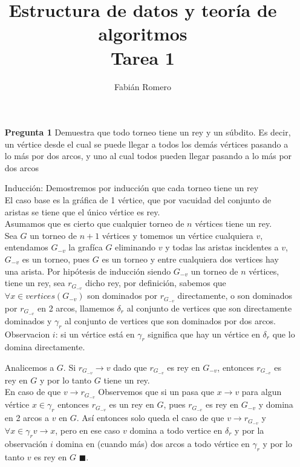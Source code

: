 \documentclass[12pt]{articlels
}
\title{Estructura de datos y teoría de algoritmos\\
Tarea 1 }
\author{Fabián Romero}
\begin{document}
\lstset{language=python}
\maketitle

\begin{itemize}
  \item[\bf{Pregunta 1}] Demuestra que todo torneo tiene un rey y un súbdito. Es decir, un vértice desde el cual se puede llegar a todos los demás vértices pasando a lo más por dos arcos, y uno al cual todos pueden llegar pasando a lo más por dos arcos

  \item[Inducción:] 
    Demostremos por inducción que cada torneo tiene un rey\\
    El caso base es la gráfica de 1 vértice, que por vacuidad del conjunto de aristas se tiene que el único vértice es rey.\\
    Asumamos que es cierto que cualquier torneo de $n$ vértices tiene un rey.\\
    Sea $G$ un torneo de $n+1$ vértices y tomemos un vértice cualquiera $v$, entendamos $G_{-v}$ la grafíca $G$ eliminando $v$ y todas las aristas incidentes a $v$, $G_{-v}$ es un torneo, pues $G$ es un torneo y entre cualquiera dos vertices hay una arista.
    Por hipótesis de inducción siendo $G_{-v}$ un torneo de $n$ vértices, tiene un rey, sea $r_{G_{-v}}$ dicho rey, por definición, sabemos que $\forall x \in vertices(G_{-v})$ son dominados por $r_{G_{-v}}$ directamente, o son dominados por $r_{G_{-v}}$ en 2 arcos, llamemos $\delta_{r}$ al conjunto de vertices que son directamente dominados y $\gamma_{r}$ al conjunto de vertices que son dominados por dos arcos.  Observacion $i$:  si un vértice está en $\gamma_{r}$ significa que hay un vértice en $\delta_{r}$ que lo domina directamente.

Analicemos a $G$.
Si $r_{G_{-v}} \rightarrow v$ dado que $r_{G_{-v}}$ es rey en $G_{-v}$, entonces $r_{G_{-v}}$ es rey en $G$ y por lo tanto $G$ tiene un rey.\\
En caso de que $v \rightarrow r_{G_{-v}}$ Observemos que si un pasa que $x \rightarrow v$ para algun vértice $x \in \gamma_{r}$ entonces $r_{G_{-v}}$ es un rey en $G$, pues $r_{G_{-v}}$ es rey en $G_{-v}$ y domina en 2 arcos a $v$ en $G$.
Así entonces solo queda el caso de que $v \rightarrow r_{G_{-v}}$ y $\forall x \in \gamma_{r}  v \rightarrow x$, pero en ese caso $v$ domina a todo vertice en $\delta_{r}$ y por la observación $i$ domina en (cuando más) dos arcos a todo vértice en $\gamma_{r}$ y por lo tanto $v$ es rey en $G$ $\blacksquare$.\\


\end{itemize}
\end{document}
